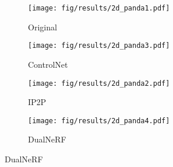 \begin{figure}
    \centering

    \begin{subfigure}{0.24\linewidth}
        \begin{minipage}[t]{1.0\linewidth}
            \centering
            \caption{Original}
            \texttt{[image: fig/results/2d\_panda1.pdf]}
        \end{minipage}
    \end{subfigure}
    \hfill
    \begin{subfigure}{0.24\linewidth}
        \begin{minipage}[t]{1.0\linewidth}
            \centering
            \caption{ControlNet}
            \texttt{[image: fig/results/2d\_panda3.pdf]}
        \end{minipage}
    \end{subfigure}
    \hfill
    \begin{subfigure}{0.24\linewidth}
        \begin{minipage}[t]{1.0\linewidth}
            \centering
            \caption{IP2P}
            \texttt{[image: fig/results/2d\_panda2.pdf]}
        \end{minipage}
    \end{subfigure}
    \hfill
    \begin{subfigure}{0.24\linewidth}
        \begin{minipage}[t]{1.0\linewidth}
            \centering
            \caption{DualNeRF}
            \texttt{[image: fig/results/2d\_panda4.pdf]}
        \end{minipage}
    \end{subfigure}

    \vspace{2px}


\end{figure}

